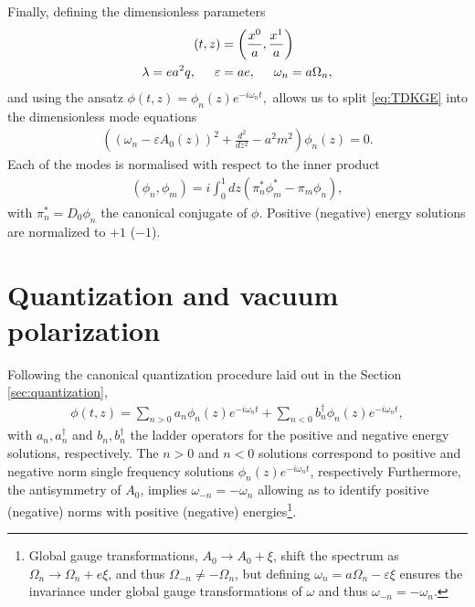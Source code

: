 Finally, defining the dimensionless parameters 
		\begin{align}
			\begin{split}
				(t, z) &= \left(\frac{x^{0}}{a}	,\frac{x^{1}}{a}	  \right) \\
					\lambda = ea^2q,  \hspace{0.5cm}
				\varepsilon &= ae, \hspace{0.5cm}
				\omega_n = a\Omega_{n},
			\end{split}
		\end{align}
		and using the ansatz
		$	\phi(t, z) = \phi_n(z) e^{-i\omega_n t},$
		allows us to split \eqref{eq:TDKGE} into the dimensionless mode equations 
		\begin{align}
			\left( (\omega_n - \varepsilon A_0(z) )^2 + \frac{d^2}{dz^2}- a^2m^2 \right) \phi_n(z) = 0.
		\label{eq:TIKGE}
		\end{align}
		Each of the modes is normalised with respect to the inner product
		\begin{align}
			(\phi_n, \phi_m) = i \int_{0}^{1} dz \left( \pi^*_n \phi^*_m - \pi_m \phi_n \right),
			\label{eq:symplectic-inner-product}
		\end{align}
		with $\pi_n^* = D_0\phi_n$ the canonical conjugate of $\phi.$ Positive (negative) energy solutions are normalized to $+1$ ($-1$).

		\section{Quantization and vacuum polarization}

		Following the canonical quantization procedure laid out in the Section \ref{sec:quantization}, 
		\begin{align}
			\phi(t, z) = \sum_{n>0}^{} a_n \phi_n(z) e^{-i\omega_n t} + \sum_{n<0}^{} b_n^\dagger \phi_n(z) e^{-i\omega_n t},
		\end{align}
		with $a_n, a_n^\dagger$ and $b_n, b_n^\dagger$ the ladder operators for the positive and negative energy solutions, respectively. The $n>0$ and $n<0$ solutions correspond to positive and negative norm single frequency solutions $\phi_n(z) e^{-i\omega_n t}$, respectively
         Furthermore, the antisymmetry of $A_0$, implies  $\omega_{-n} = -\omega_n$ allowing as to identify positive (negative) norms with positive (negative) energies\footnote{Global gauge transformations,  $A_0 \to A_0 + \xi$, shift the spectrum as $\Omega_n \to \Omega_n + e\xi$,  and thus $\Omega_{-n} \neq -\Omega_n$, but defining $\omega_n = a\Omega_n -  \varepsilon \xi$ ensures the invariance under global gauge transformations of $\omega$ and thus $\omega_{-n} = -\omega_n$.}.
        
